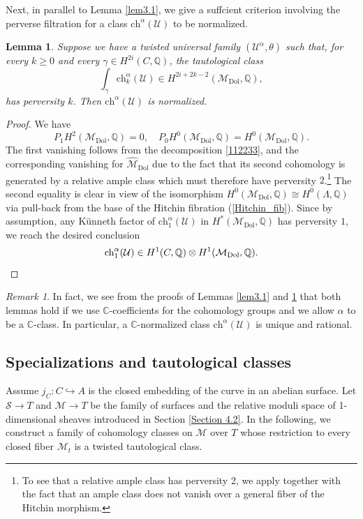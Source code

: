 \documentclass[11pt]{amsart}
\theoremstyle{plain}
\newtheorem{lem}[thm]{Lemma}
\theoremstyle{definition}
\theoremstyle{remark}
\newtheorem{rmk}[thm]{Remark}
\newcommand{\BC}{{\mathbb{C}}}
\newcommand{\BQ}{{\mathbb{Q}}}
\newcommand{\CM}{{\mathcal M}}
\newcommand{\CS}{{\mathcal S}}
\newcommand{\CU}{{\mathcal U}}
\begin{document}
Next, in parallel to Lemma \ref{lem3.1},  we give a suffcient criterion involving the perverse filtration  for a class $\mathrm{ch}^\alpha(\CU)$ to be normalized.

\begin{lem}\label{lem4.7}
Suppose we have a twisted universal family $(\CU^\alpha, \theta)$ such that, for every $k \geq 0$ and 
every $\gamma \in H^{2i}(C, \BQ)$, the tautological class 
\begin{equation*}
\int_\gamma \mathrm{ch}^\alpha_k(\CU) \in H^{2i+2k-2}(\CM_\mathrm{Dol}, \BQ),
\end{equation*}
has perversity $k$. Then $\mathrm{ch}^\alpha(\CU)$ is normalized.
\end{lem}

\begin{proof}
We have 
\[
 P_1H^2(\CM_{\mathrm{Dol}}, \BQ) = 0, \quad  P_0H^0(\CM_{\mathrm{Dol}}, \BQ)=H^0(\CM_{\mathrm{Dol}}, \BQ).
\]
The first vanishing follows from the decomposition \eqref{112233}, and the corresponding vanishing for $\hat{\CM}_{\mathrm{Dol}}$ due to the fact that its second cohomology is generated by a relative ample class which must therefore have perversity $2$.\footnote{To see that a relative ample class has perversity 2, we apply \cite[Theorem 1.4.8]{dCHM1} together with the fact that an ample class does not vanish over a general fiber of the Hitchin morphism.} The second equality is clear in view of the isomorphism $H^0 (\CM_{\mathrm{Dol}},\BQ) \cong H^0 (\Lambda, \BQ)$ via pull-back from the base of the Hitchin fibration (\ref{Hitchin_fib}).
Since by assumption, any K\"unneth factor of $\mathrm{ch}_1^\alpha(\CU)$ in $H^*(\CM_{\mathrm{Dol}}, \BQ)$ has perversity $1$, we reach the desired conclusion
\[
\mathrm{ch}_1^\alpha(\CU) \in  H^1(C, \BQ)\otimes H^1(\CM_\mathrm{Dol} ,\BQ). \qedhere
\]
\end{proof}

\begin{rmk}\label{rmk4.8}
In fact, we see from the proofs of Lemmas \ref{lem3.1} and \ref{lem4.7} that both lemmas hold if we use $\BC$-coefficients for the cohomology groups and we allow $\alpha$ to be a $\BC$-class. In particular, a $\BC$-normalized class $\mathrm{ch}^\alpha(\CU)$ is unique and rational.
\end{rmk}



\subsection{Specializations and tautological classes}
Assume $j_C: C\hookrightarrow A$ is the closed embedding of the curve in an abelian surface. Let $\CS \to T$ and $\CM \to T$ be the family of surfaces and the relative moduli space of 1-dimensional sheaves introduced in Section \ref{Section 4.2}. In the following, we construct a family of cohomology classes on $\CM$ over $T$ whose restriction to every closed fiber $\CM_t$ is a twisted tautological class.
\end{document}
